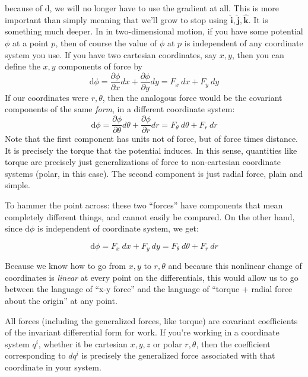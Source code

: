 	because of $\mathrm d$, we will no longer have to use the gradient at all. This is more important than simply meaning that we'll grow to stop using $\mathbf{\hat i}, \mathbf{\hat j},\mathbf{\hat k}$. It is something much deeper. In in two-dimensional motion, if you have some potential $\phi$ at a point $p$, then of course the value of $\phi$ at $p$ is independent of any coordinate system you use. If you have two cartesian coordinates, say $x,y$, then you can define the $x,y$ components of force by 
	\begin{equation*}
		\mathrm d \phi= \frac{\partial \phi}{\partial x} dx + \frac{\partial \phi}{\partial y} dy= F_x ~ dx + F_y ~dy 
	\end{equation*}
	If our coordinates were $r,\theta$, then the analogous force would be the covariant components of the same \emph{form}, in a different coordinate system:
	\begin{equation*}
		\mathrm d \phi = \frac{\partial \phi}{\partial \theta} d\theta + \frac{\partial \phi}{\partial r} dr = F_\theta ~ d\theta + F_r ~ dr
	\end{equation*}
	Note that the first component has units not of force, but of force times distance. It is precisely the torque that the potential induces. In this sense, quantities like torque are precisely just generalizations of force to non-cartesian coordinate systems (polar, in this case). The second component is just radial force, plain and simple.
	
	To hammer the point across: these two ``forces'' have components that mean completely different things, and cannot easily be compared. On the other hand, since $\mathrm d \phi$ is independent of coordinate system, we get:
	
	\begin{equation}
		\mathrm d \phi = F_x ~ dx + F_y ~ dy = F_\theta ~ d\theta + F_r ~ dr 
	\end{equation}
	
	Because we know how to go from $x,y$ to $r, \theta$ and because this nonlinear change of coordinates is \emph{linear} at every point on the differentials, this would allow us to go between the language of ``x-y force'' and the language of ``torque + radial force about the origin''  at any point.
	
	All forces (including the generalized forces, like torque) are covariant coefficients of the invariant differential form for work. If you're working in a coordinate system $q^i$, whether it be cartesian $x,y,z$ or polar $r, \theta$, then the coefficient corresponding to $dq^i$ is precisely the generalized force associated with that coordinate in your system.\\
	
